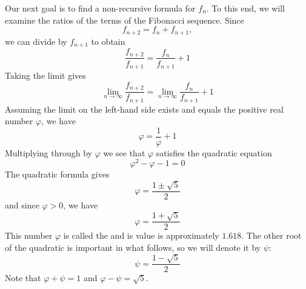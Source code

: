 \documentclass[handout]{ximera}
\begin{document}
Our next goal is to find a non-recursive formula for $f_n$. To this end, 
we will examine the ratios of the terms of the Fibonacci sequence. Since
\[
f_{n+2} = f_n + f_{n+1},
\]
we can divide by $f_{n+1}$ to obtain
\[
\frac{f_{n+2}}{f_{n+1}} = \frac{f_{n}}{f_{n+1}} + 1
\]
Taking the limit gives
\[
\lim_{n \to \infty} \frac{f_{n+2}}{f_{n+1}} = \lim_{n \to \infty} \frac{f_{n}}{f_{n+1}} + 1
\]
Assuming the limit on the left-hand side exists and equals the positive real number $\varphi$, we have
\[
\varphi = \frac{1}{\varphi} + 1
\]
Multiplying through by $\varphi$ we see that $\varphi$ satisfies the quadratic equation
\[
\varphi^2 -\varphi - 1 =0
\]
The quadratic formula gives 
\[
\varphi = \frac{1 \pm \sqrt 5}{2}
\]
and since $\varphi >0$, we have
\[
\varphi = \frac{1 + \sqrt 5}{2}
\]
This number $\varphi$ is called the  and is value is approximately $1.618$. 
The other root of the quadratic is important in what follows, so we will denote it by $\psi$:
\[
\psi = \frac{1 - \sqrt 5}{2}
\]
Note that $\varphi + \psi = 1$ and $\varphi - \psi = \sqrt 5$.
\end{document}
